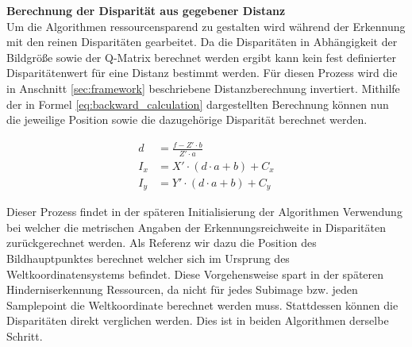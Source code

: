 	
\noindent
\textbf{Berechnung der Disparität aus gegebener Distanz}\\
Um die Algorithmen ressourcensparend zu gestalten wird während der Erkennung mit den reinen Disparitäten gearbeitet. Da die Disparitäten in Abhängigkeit der Bildgröße sowie der Q-Matrix berechnet werden ergibt kann kein fest definierter Disparitätenwert für eine Distanz bestimmt werden. Für diesen Prozess wird die in Anschnitt \ref{sec:framework} beschriebene Distanzberechnung invertiert. Mithilfe der in Formel \ref{eq:backward_calculation} dargestellten Berechnung können nun die jeweilige Position sowie die dazugehörige Disparität berechnet werden. 

\begin{equation}
  \label{eq:backward_calculation}
  \begin{aligned}
    d &= \frac{f- Z' \cdot b}{Z' \cdot a}\\
    I_x &= X' \cdot (d \cdot a + b) + C_x\\
    I_y &= Y' \cdot (d \cdot a + b) + C_y
  \end{aligned}
\end{equation}

\noindent
Dieser Prozess findet in der späteren Initialisierung der Algorithmen Verwendung bei welcher die metrischen Angaben der Erkennungsreichweite in Disparitäten zurückgerechnet werden. Als Referenz wir dazu die Position des Bildhauptpunktes berechnet welcher sich im Ursprung des Weltkoordinatensystems befindet. Diese Vorgehensweise spart in der späteren Hinderniserkennung Ressourcen, da nicht für jedes Subimage bzw. jeden Samplepoint die Weltkoordinate berechnet werden muss. Stattdessen können die Disparitäten direkt verglichen werden. Dies ist in beiden Algorithmen derselbe Schritt.\\


